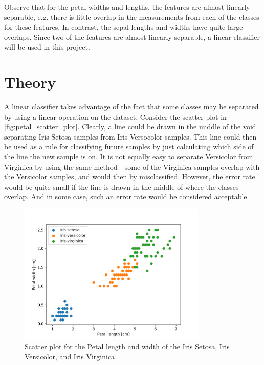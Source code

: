 \documentclass{article}
\begin{document}
Observe that for the petal widths and lengths, the features are almost linearly separable, e.g.
there is little overlap in the measurements from each of the classes for these features. In contrast,
the sepal lengths and widths have quite large overlaps. Since two of the features are almost
linearly separable, a linear classifier will be used in this project.

\section{Theory}

A linear classifier takes advantage of the fact that some classes may be separated by using a
linear operation on the dataset. Consider the scatter plot in \autoref{fig:petal_scatter_plot}.
Clearly, a line could be drawn in the middle of the void separating Iris Setosa samples from
Iris Versocolor samples. This line could then be used as a rule for classifying future samples
by just calculating which side of the line the new sample is on. It is not equally easy to
separate Versicolor from Virginica by using the same method - some of the Virginica samples overlap
with the Versicolor samples, and would then by misclassified. However, the error rate would be
quite small if the line is drawn in the middle of where the classes overlap. And in some case,
such an error rate would be considered acceptable.

\begin{figure}
    \centering
    \includegraphics[width=0.8\textwidth]{../images/petal_scatter.png}
    \caption{Scatter plot for the Petal length and width of the Iris Setosa, Iris Versicolor,
    and Iris Virginica}
    \label{fig:petal_scatter_plot}
\end{figure}
\end{document}

